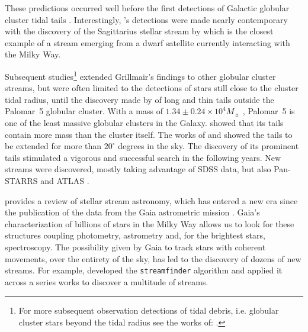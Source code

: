 \documentclass[draft]{aa}
\begin{document}
  These predictions occurred well before the first detections of Galactic globular cluster tidal tails \citep{1995AJ....109.2553G}. Interestingly, \citet{1995AJ....109.2553G}'s detections were made nearly contemporary  with the discovery of the Sagittarius stellar stream by \citet{1994Natur.370..194I} which is the closest example of a stream emerging from a dwarf satellite currently interacting with the Milky Way. 
  
  Subsequent studies\footnote{For more subsequent observation detections of tidal debris, i.e. globular cluster stars beyond the tidal radius see the works of: \citet{1997A&A...320..776L, 2000A&A...356..127T, 2000A&A...359..907L, 2001AAS...19910906S, 2003AJ....126..815L,2011ApJ...726...47S,2018MNRAS.476.4814S,2020MNRAS.495.2222S}.} extended Grillmair's findings to other globular cluster streams, but were often limited to the detections of stars still close to the cluster tidal radius, until the discovery made by \citet{2001ApJ...548L.165O,2002AAS...200.1001O, 2003AJ....126.2385O} of long and thin tails outside the Palomar~5 globular cluster. With a mass of $1.34\pm 0.24 \times 10^4 M_{\sun}$ \citep{2019MNRAS.482.5138B}, Palomar~5 is one of the least massive globular clusters in the Galaxy. \citet{2003AJ....126.2385O} showed that its tails contain more mass than the cluster itself. The works of \citet{2006ApJ...641L..37G} and \citet{2015MNRAS.446.3297K} showed the tails to be extended for more than $20^\circ$ degrees in the sky. The discovery of its prominent tails stimulated a vigorous and successful search in the following years. New streams were discovered, mostly taking advantage of SDSS data, but also Pan-STARRS and ATLAS  \citep{2006ApJ...643L..17G, 2006ApJ...637L..29B, 2009ApJ...693.1118G, 2012ApJ...760L...6B, 2013ApJ...769L..23G, 2014ApJ...790L..10G, 2015ApJ...812L..26G, 2014MNRAS.443L..84B, 2016MNRAS.463.1759B, 2017ApJ...847..119G, 2014MNRAS.442L..85K}. 
  
  
  \citet{2025NewAR.10001713B} provides a review of stellar stream astronomy, which has entered a new era since the publication of the data from the Gaia astrometric mission \citep{2016A&A...595A...1G}. Gaia's characterization of billions of stars in the Milky Way allows us to look for these structures coupling photometry, astrometry and, for the brightest stars, spectroscopy. The possibility given by Gaia to track stars with coherent movements, over the entirety of the sky, has led to the discovery of dozens of new streams. For example, \citet{2018MNRAS.477.4063M} developed the \texttt{streamfinder} algorithm and applied it across a series works \citep{2018MNRAS.481.3442M,  2018ApJ...865...85I, 2019ApJ...872..152I} to discover a multitude of streams.%
  
\end{document}
